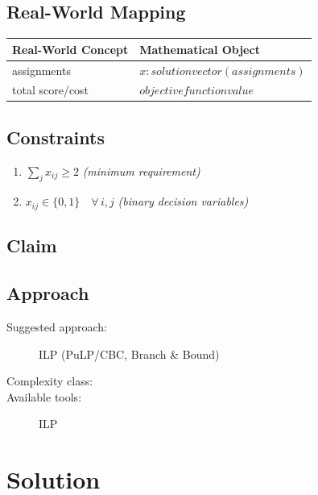 \documentclass[11pt, a4paper]{article}
\begin{document}
\subsection{Real-World Mapping}

\begin{longtable}{ll}
\toprule
\textbf{Real-World Concept} & \textbf{Mathematical Object} \\
\midrule
\endhead
assignments & $x: solution vector (assignments)$ \\
total score/cost & $objective function value$ \\
\bottomrule
\end{longtable}

\subsection{Constraints}

\begin{enumerate}
  \item $\sum_j x_{ij} \ge 2$
  \hfill \textit{(minimum requirement)}
  \item $x_{ij} \in \{0, 1\} \quad \forall\, i, j$
  \hfill \textit{(binary decision variables)}
\end{enumerate}

\subsection{Claim}


\subsection{Approach}

\begin{description}
  \item[Suggested approach:] ILP (PuLP/CBC, Branch \& Bound)
  \item[Complexity class:] 
  \item[Available tools:] ILP
\end{description}
\section{Solution}
\end{document}
